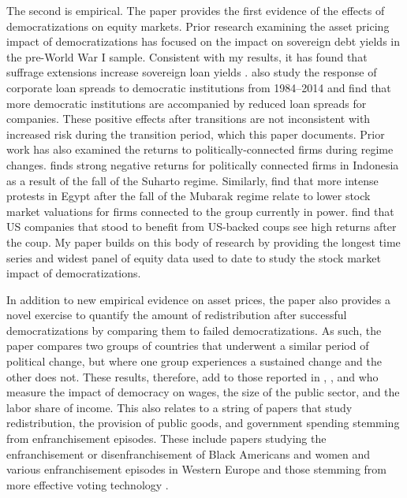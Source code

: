 The second is empirical. The paper provides the first evidence of the effects of democratizations on equity markets. Prior research examining the asset pricing impact of democratizations has focused on the impact on sovereign debt yields in the pre-World War I sample. Consistent with my results, it has found that suffrage extensions increase sovereign loan yields \citep{Dasgupta2021,Tuncer2022}. \cite*{Delis2019} also study the response of corporate loan spreads to democratic institutions from 1984--2014 and find that more democratic institutions are accompanied by reduced loan spreads for companies. These positive effects after transitions are not inconsistent with increased risk during the transition period, which this paper documents. Prior work has also examined the returns to politically-connected firms during regime changes. \cite{Fisman2001} finds strong negative returns for politically connected firms in Indonesia as a result of the fall of the Suharto regime. Similarly, \cite*{Acemoglu2018} find that more intense protests in Egypt after the fall of the Mubarak regime relate to lower stock market valuations for firms connected to the group currently in power. \cite*{Dube2011} find that US companies that stood to benefit from US-backed coups see high returns after the coup. My paper builds on this body of research by providing the longest time series and widest panel of equity data used to date to study the stock market impact of democratizations.

In addition to new empirical evidence on asset prices, the paper also provides a novel exercise to quantify the amount of redistribution after successful democratizations by comparing them to failed democratizations. As such, the paper compares two groups of countries that underwent a similar period of political change, but where one group experiences a sustained change and the other does not. These results, therefore, add to those reported in \cite*{Rodrik1999}, \cite*{Acemoglu2015}, and \cite*{Drautzburg2022} who measure the impact of democracy on wages, the size of the public sector, and the labor share of income. This also relates to a string of papers that study redistribution, the provision of public goods, and government spending stemming from enfranchisement episodes. These include papers studying the enfranchisement or disenfranchisement of Black Americans \citep{Husted1997,Naidu2012,Cascio2013} and women \citep{Miller2008} and various enfranchisement episodes in Western Europe \citep{Aidt2009,Hinnerich2014} and those stemming from more effective voting technology \citep{Fujiwara2015}. 


